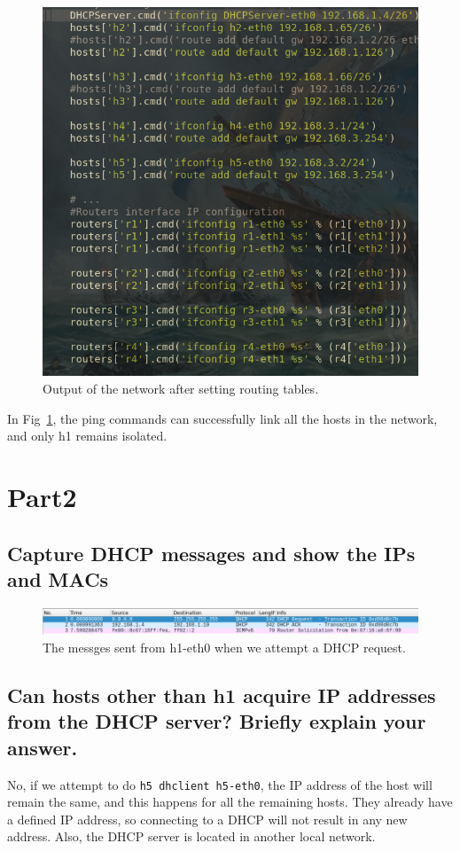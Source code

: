 \documentclass{article}
\begin{document}
\begin{figure}[h]
		\centering
		\label{fig:topo}
		\includegraphics[scale=0.3]{topoConf.png}
		\caption{Output of the network after setting routing tables.}
\end{figure}

In Fig~\ref{fig:topo}, the ping commands can successfully
link all the hosts in the network, and only h1 remains isolated.
\section{Part2}
\subsection{Capture DHCP messages and show the IPs and MACs}
\begin{figure}[h]
	\centering
	\includegraphics[scale=0.3]{h1dhcp.png}
	\caption{The messges sent from h1-eth0 when we attempt a DHCP request.}
\end{figure}
\subsection{Can hosts other than h1 acquire IP addresses from the DHCP server? 
Briefly explain your answer.}
No, if we attempt to do \texttt{h5 dhclient h5-eth0}, the IP address of the host 
will remain the same, and this happens for all the remaining hosts.
They already have a defined IP address, so connecting to a DHCP will not result
in any new address.
Also, the DHCP server is located in another local network.
\end{document}
